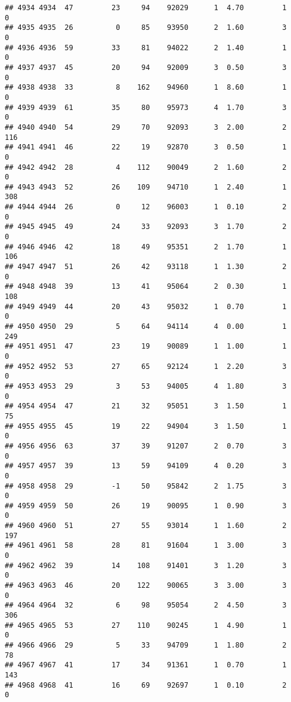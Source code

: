 \documentclass[
]{article}
\begin{document}
\begin{verbatim}
## 4934 4934  47         23     94    92029      1  4.70         1        0
## 4935 4935  26          0     85    93950      2  1.60         3        0
## 4936 4936  59         33     81    94022      2  1.40         1        0
## 4937 4937  45         20     94    92009      3  0.50         3        0
## 4938 4938  33          8    162    94960      1  8.60         1        0
## 4939 4939  61         35     80    95973      4  1.70         3        0
## 4940 4940  54         29     70    92093      3  2.00         2      116
## 4941 4941  46         22     19    92870      3  0.50         1        0
## 4942 4942  28          4    112    90049      2  1.60         2        0
## 4943 4943  52         26    109    94710      1  2.40         1      308
## 4944 4944  26          0     12    96003      1  0.10         2        0
## 4945 4945  49         24     33    92093      3  1.70         2        0
## 4946 4946  42         18     49    95351      2  1.70         1      106
## 4947 4947  51         26     42    93118      1  1.30         2        0
## 4948 4948  39         13     41    95064      2  0.30         1      108
## 4949 4949  44         20     43    95032      1  0.70         1        0
## 4950 4950  29          5     64    94114      4  0.00         1      249
## 4951 4951  47         23     19    90089      1  1.00         1        0
## 4952 4952  53         27     65    92124      1  2.20         3        0
## 4953 4953  29          3     53    94005      4  1.80         3        0
## 4954 4954  47         21     32    95051      3  1.50         1       75
## 4955 4955  45         19     22    94904      3  1.50         1        0
## 4956 4956  63         37     39    91207      2  0.70         3        0
## 4957 4957  39         13     59    94109      4  0.20         3        0
## 4958 4958  29         -1     50    95842      2  1.75         3        0
## 4959 4959  50         26     19    90095      1  0.90         3        0
## 4960 4960  51         27     55    93014      1  1.60         2      197
## 4961 4961  58         28     81    91604      1  3.00         3        0
## 4962 4962  39         14    108    91401      3  1.20         3        0
## 4963 4963  46         20    122    90065      3  3.00         3        0
## 4964 4964  32          6     98    95054      2  4.50         3      306
## 4965 4965  53         27    110    90245      1  4.90         1        0
## 4966 4966  29          5     33    94709      1  1.80         2       78
## 4967 4967  41         17     34    91361      1  0.70         1      143
## 4968 4968  41         16     69    92697      1  0.10         2        0

\end{verbatim}
\end{document}
